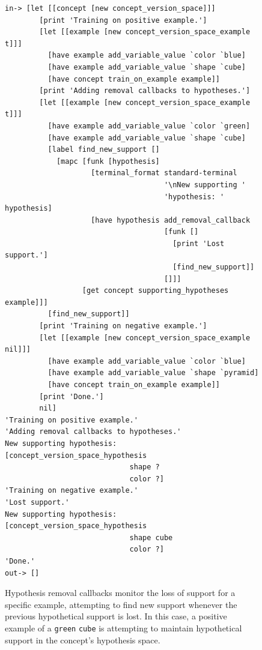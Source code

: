 \begin{figure}[h]
\centering
{\scriptsize
\begin{Verbatim}[frame=single]
 in-> [let [[concept [new concept_version_space]]]
        [print 'Training on positive example.']
        [let [[example [new concept_version_space_example t]]]
          [have example add_variable_value `color `blue]
          [have example add_variable_value `shape `cube]
          [have concept train_on_example example]]
        [print 'Adding removal callbacks to hypotheses.']
        [let [[example [new concept_version_space_example t]]]
          [have example add_variable_value `color `green]
          [have example add_variable_value `shape `cube]
          [label find_new_support []
            [mapc [funk [hypothesis]
                    [terminal_format standard-terminal
                                     '\nNew supporting '
                                     'hypothesis: ' hypothesis]
                    [have hypothesis add_removal_callback
                                     [funk []
                                       [print 'Lost support.']
                                       [find_new_support]]
                                     []]]
                  [get concept supporting_hypotheses example]]]
          [find_new_support]]
        [print 'Training on negative example.']
        [let [[example [new concept_version_space_example nil]]]
          [have example add_variable_value `color `blue]
          [have example add_variable_value `shape `pyramid]
          [have concept train_on_example example]]
        [print 'Done.']
        nil]
'Training on positive example.'
'Adding removal callbacks to hypotheses.'
New supporting hypothesis: [concept_version_space_hypothesis
                             shape ?
                             color ?]
'Training on negative example.'
'Lost support.'
New supporting hypothesis: [concept_version_space_hypothesis
                             shape cube
                             color ?]
'Done.'
out-> []
\end{Verbatim}
}
\caption[Hypothesis removal callbacks used to monitor the loss of
  support for a specific example, attempting to find new support
  whenever the previous hypothetical support is lost.]{Hypothesis
  removal callbacks monitor the loss of support for a specific
  example, attempting to find new support whenever the previous
  hypothetical support is lost.  In this case, a positive example of a
  {\tt{green}} {\tt{cube}} is attempting to maintain hypothetical
  support in the concept's hypothesis space.}
\label{figure:concept_version_space_hypothetical_support}
\end{figure}

